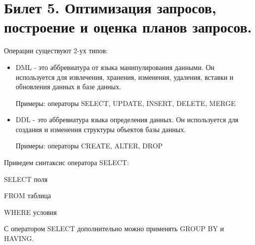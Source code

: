 \newpage
\section {Билет 5. Оптимизация запросов, построение и оценка планов запросов.}

Операции существуют 2-ух типов: 
\begin{itemize}
    \item DML - это аббревиатура от языка манипулирования данными. Он используется для извлечения, хранения, изменения, удаления, вставки и обновления данных в базе данных.

Примеры: операторы SELECT, UPDATE, INSERT, DELETE, MERGE

\item DDL - это аббревиатура языка определения данных. Он используется для создания и изменения структуры объектов базы данных.

Примеры: операторы CREATE, ALTER, DROP
\end{itemize}

Приведем синтаксис оператора SELECT: 

SELECT поля

FROM таблица 

WHERE условия 

С оператором SELECT дополнительно можно применять GROUP BY и HAVING.  
\\[10pt]

